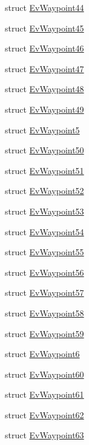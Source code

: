 \begin{DoxyCompactItemize}
struct \hyperlink{structcl__move__base__z_1_1EvWaypoint44}{Ev\+Waypoint44}
\item 
struct \hyperlink{structcl__move__base__z_1_1EvWaypoint45}{Ev\+Waypoint45}
\item 
struct \hyperlink{structcl__move__base__z_1_1EvWaypoint46}{Ev\+Waypoint46}
\item 
struct \hyperlink{structcl__move__base__z_1_1EvWaypoint47}{Ev\+Waypoint47}
\item 
struct \hyperlink{structcl__move__base__z_1_1EvWaypoint48}{Ev\+Waypoint48}
\item 
struct \hyperlink{structcl__move__base__z_1_1EvWaypoint49}{Ev\+Waypoint49}
\item 
struct \hyperlink{structcl__move__base__z_1_1EvWaypoint5}{Ev\+Waypoint5}
\item 
struct \hyperlink{structcl__move__base__z_1_1EvWaypoint50}{Ev\+Waypoint50}
\item 
struct \hyperlink{structcl__move__base__z_1_1EvWaypoint51}{Ev\+Waypoint51}
\item 
struct \hyperlink{structcl__move__base__z_1_1EvWaypoint52}{Ev\+Waypoint52}
\item 
struct \hyperlink{structcl__move__base__z_1_1EvWaypoint53}{Ev\+Waypoint53}
\item 
struct \hyperlink{structcl__move__base__z_1_1EvWaypoint54}{Ev\+Waypoint54}
\item 
struct \hyperlink{structcl__move__base__z_1_1EvWaypoint55}{Ev\+Waypoint55}
\item 
struct \hyperlink{structcl__move__base__z_1_1EvWaypoint56}{Ev\+Waypoint56}
\item 
struct \hyperlink{structcl__move__base__z_1_1EvWaypoint57}{Ev\+Waypoint57}
\item 
struct \hyperlink{structcl__move__base__z_1_1EvWaypoint58}{Ev\+Waypoint58}
\item 
struct \hyperlink{structcl__move__base__z_1_1EvWaypoint59}{Ev\+Waypoint59}
\item 
struct \hyperlink{structcl__move__base__z_1_1EvWaypoint6}{Ev\+Waypoint6}
\item 
struct \hyperlink{structcl__move__base__z_1_1EvWaypoint60}{Ev\+Waypoint60}
\item 
struct \hyperlink{structcl__move__base__z_1_1EvWaypoint61}{Ev\+Waypoint61}
\item 
struct \hyperlink{structcl__move__base__z_1_1EvWaypoint62}{Ev\+Waypoint62}
\item 
struct \hyperlink{structcl__move__base__z_1_1EvWaypoint63}{Ev\+Waypoint63}

\end{DoxyCompactItemize}
